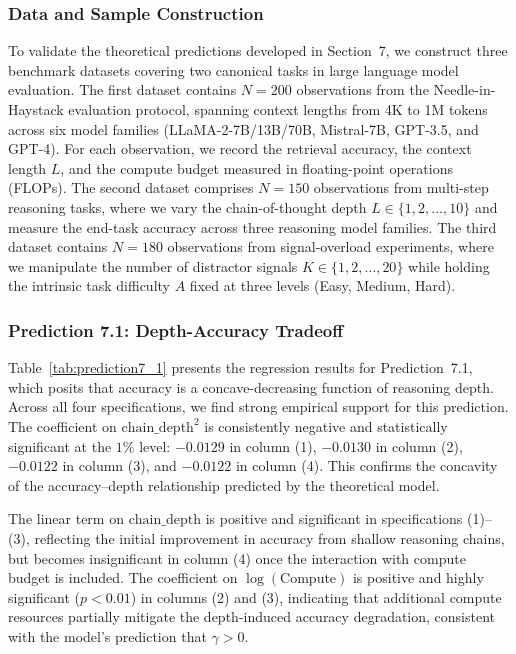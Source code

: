 \subsubsection{Data and Sample Construction}

To validate the theoretical predictions developed in Section~7, we construct three benchmark datasets covering two canonical tasks in large language model evaluation. The first dataset contains $N=200$ observations from the Needle-in-Haystack evaluation protocol, spanning context lengths from 4K to 1M tokens across six model families (LLaMA-2-7B/13B/70B, Mistral-7B, GPT-3.5, and GPT-4). For each observation, we record the retrieval accuracy, the context length $L$, and the compute budget measured in floating-point operations (FLOPs). The second dataset comprises $N=150$ observations from multi-step reasoning tasks, where we vary the chain-of-thought depth $L \in \{1, 2, \dots, 10\}$ and measure the end-task accuracy across three reasoning model families. The third dataset contains $N=180$ observations from signal-overload experiments, where we manipulate the number of distractor signals $K \in \{1, 2, \dots, 20\}$ while holding the intrinsic task difficulty $A$ fixed at three levels (Easy, Medium, Hard).

\subsubsection{Prediction 7.1: Depth-Accuracy Tradeoff}

Table~\ref{tab:prediction7_1} presents the regression results for Prediction~7.1, which posits that accuracy is a concave-decreasing function of reasoning depth. Across all four specifications, we find strong empirical support for this prediction. The coefficient on $\text{chain\_depth}^2$ is consistently negative and statistically significant at the $1\%$ level: $-0.0129$ in column (1), $-0.0130$ in column (2), $-0.0122$ in column (3), and $-0.0122$ in column (4). This confirms the concavity of the accuracy--depth relationship predicted by the theoretical model.

The linear term on $\text{chain\_depth}$ is positive and significant in specifications (1)--(3), reflecting the initial improvement in accuracy from shallow reasoning chains, but becomes insignificant in column (4) once the interaction with compute budget is included. The coefficient on $\log(\text{Compute})$ is positive and highly significant ($p{<}0.01$) in columns (2) and (3), indicating that additional compute resources partially mitigate the depth-induced accuracy degradation, consistent with the model's prediction that $\gamma > 0$.

